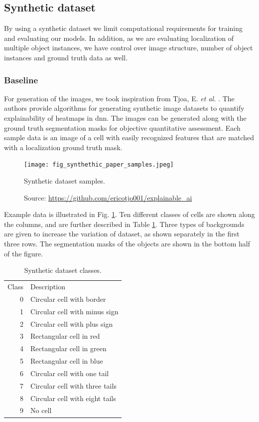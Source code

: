 \subsection{Synthetic dataset}
By using a synthetic dataset we limit computational requirements for training and evaluating our models. In addition, as we are evaluating localization of multiple object instances, we have control over image structure, number of object instances and ground truth data as well.

\subsubsection{Baseline}
For generation of the images, we took inspiration from Tjoa, E. \textit{et al.} \cite{tjoa2022quantifying}. The authors provide algorithms for generating synthetic image datasets to quantify explainability of heatmaps in \acrshort{dnn}. The images can be generated along with the ground truth segmentation masks for objective quantitative assessment. Each sample data is an image of a cell with easily recognized features that are matched with a localization ground truth mask.
\begin{figure}[ht]
    \begin{center}       
    \texttt{[image: fig\_synthethic\_paper\_samples.jpeg]}
    \caption[Synthetic dataset samples]{Synthetic dataset samples.}
    \caption*{Source: \href{https://github.com/ericotjo001/explainable\_ai}{https://github.com/ericotjo001/explainable\_ai}}
    \label{fig:synthetic_paper_samples}
    \end{center}
\end{figure}

Example data is illustrated in Fig. \ref{fig:synthetic_paper_samples}. Ten different classes of cells are shown along the columns, and are further described in Table \ref{tab:synthetic_classes}. Three types of backgrounds are given to increase the variation of dataset, as shown separately in the first three rows. The segmentation masks of the objects are shown in the bottom half of the figure.
\begin{table}[ht]
\centering
\begin{tabular}{rl}
  \toprule
  Class & Description \\
  \cmidrule(lr){1-2}
  0 & Circular cell with border\\
  1 & Circular cell with minus sign\\
  2 & Circular cell with plus sign\\
  3 & Rectangular cell in red\\
  4 & Rectangular cell in green\\
  5 & Rectangular cell in blue\\
  6 & Circular cell with one tail\\
  7 & Circular cell with three tails\\
  8 & Circular cell with eight tails\\
  9 & No cell\\
  \bottomrule
\end{tabular}
\caption[Synthetic dataset classes]{Synthetic dataset classes.}
\label{tab:synthetic_classes}
\end{table}

